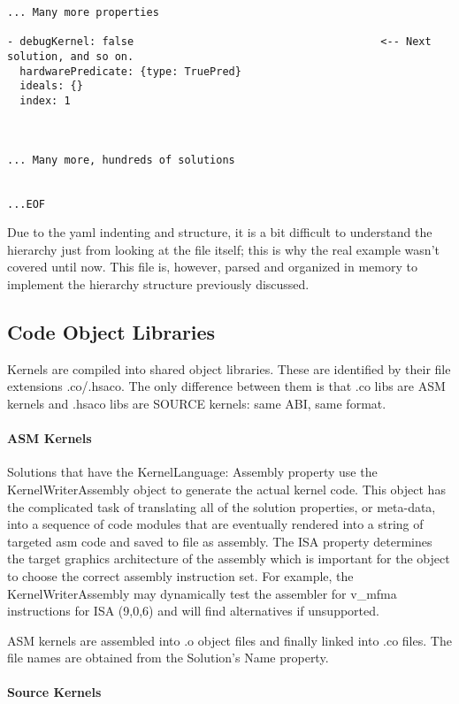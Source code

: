 \documentclass[]{article}
\begin{document}
\begin{verbatim}
... Many more properties

- debugKernel: false                                       <-- Next solution, and so on.
  hardwarePredicate: {type: TruePred}
  ideals: {}
  index: 1



... Many more, hundreds of solutions


...EOF
\end{verbatim}

\noindent
Due to the yaml indenting and structure, it is a bit difficult to understand the hierarchy just from looking at the file itself; this is why the real example wasn't covered until now. This file is, however, parsed and organized in memory to implement the hierarchy structure previously discussed.

\subsection{Code Object Libraries}

Kernels are compiled into shared object libraries. These are identified by their file extensions .co/.hsaco. The only difference between them is that .co libs are ASM kernels and .hsaco libs are SOURCE kernels: same ABI, same format.

\paragraph{ASM Kernels}

Solutions that have the KernelLanguage: Assembly property use the KernelWriterAssembly object to generate the actual kernel code. This object has the complicated task of translating all of the solution properties, or meta-data, into a sequence of code modules that are eventually rendered into a string of targeted asm code and saved to file as assembly. The ISA property determines the target graphics architecture of the assembly which is important for the object to choose the correct assembly instruction set. For example, the KernelWriterAssembly may dynamically test the assembler for v\_mfma instructions for ISA (9,0,6) and will find alternatives if unsupported.

ASM kernels are assembled into .o object files and finally linked into .co files. The file names are obtained from the Solution's Name property.

\paragraph{Source Kernels}
\end{document}
